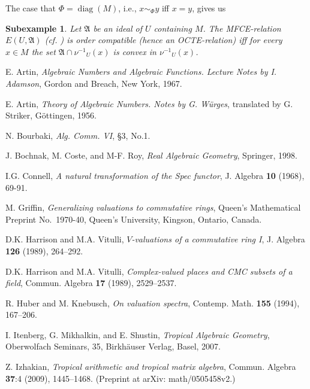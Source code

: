 \documentclass [12pt,a4paper,reqno]{amsart}
\newtheorem{sexample}[thm]{Subexample}
\begin{document}
The case that $\Phi = {\operatorname{diag}}(M)$, i.e., $x \sim_\Phi y $ iff $x=y$,
gives us
\begin{sexample}\label{examps5.17} Let ${\mathfrak A}$ be an ideal of $U$
containing $M$. The MFCE-relation $E(U, {\mathfrak A})$ (cf.
\cite[Defintion 6.15]{IKR2}) is order compatible (hence an
OCTE-relation) iff for every $x \in M$ the set ${\mathfrak A} \cap
{\nu^{-1}}_U(x)$ is convex in  ${\nu^{-1}}_U(x)$.
\end{sexample}

\begin{thebibliography}{IMS}

  E. Artin, \textit{Algebraic Numbers and Algebraic
 Functions.
 Lecture Notes by I. Adamson}, Gordon and Breach, New York, 1967.

   E. Artin, \textit{Theory of Algebraic Numbers.
  Notes by G. W\"urges}, translated by G. Striker, G\"ottingen,
  1956.

  N. Bourbaki, \textit{Alg. Comm. VI}, \S3, No.1.

 J. Bochnak, M. Coste, and M-F. Roy, \textit{Real Algebraic
Geometry}, Springer, 1998.

  I.G. Connell, \textit{A natural transformation of the Spec functor}, J. Algebra \textbf{10} (1968), 69-91.

 M. Griffin, \textit{Generalizing valuations to commutative rings},
  Queen's Mathematical Preprint No.~1970-40, Queen's University,
  Kingson, Ontario, Canada.

    D.K.
Harrison and M.A. Vitulli, \textit{$V$-valuations of a commutative
ring I}, J. Algebra   \textbf{126} (1989), 264--292.

  D.K.
Harrison and M.A. Vitulli, \textit{Complex-valued places and CMC
subsets of a field}, Commun. Algebra \textbf{17} (1989),
2529--2537.

   R. Huber and M. Knebusch, \textit{On valuation spectra},
   Contemp. Math. \textbf{155} (1994), 167--206.

  I. Itenberg, G. Mikhalkin, and E.
Shustin, \textit{Tropical Algebraic Geometry}, Oberwolfach
Seminars, 35, Birkh\"auser Verlag, Basel, 2007.

  Z. Izhakian, \textit{Tropical arithmetic and tropical matrix algebra},
  Commun. Algebra  \textbf{37}:4 (2009), {1445--1468}. (Preprint at arXiv:
  math/0505458v2.)


\end{thebibliography}
\end{document}
